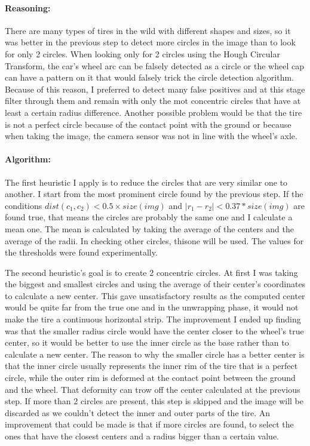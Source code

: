 \paragraph*{Reasoning:}\mbox{}\par
There are many types of tires in the wild with different shapes and sizes, so it was better in the previous step to detect more circles in the image than to look for only 2 circles. When looking only for 2 circles using the Hough Circular Transform, the car's wheel arc can be falsely detected as a circle or the wheel cap can have a pattern on it that would falsely trick the circle detection algorithm. Because of this reason, I preferred to detect many false positives and at this stage filter through them and remain with only the mot concentric circles that have at least a certain radius difference. Another possible problem would be that the tire is not a perfect circle because of the contact point with the ground or because when taking the image, the camera sensor was not in line with the wheel's axle.

\paragraph*{Algorithm:}\mbox{}\par
The first heuristic I apply is to reduce the circles that are very similar one to another. I start from the most prominent circle found by the previous step. If the conditions $dist(c_1, c_2) < 0.5 \times size(img)$ and $\Big|r_1 - r_2\Big| < 0.37 * size(img)$ are found true, that means the circles are probably the same one and I calculate a mean one. The mean is calculated by taking the average of the centers and the average of the radii. In checking other circles, thisone will be used. The values for the thresholds were found experimentally.

The second heuristic's goal is to create 2 concentric circles. At first I was taking the biggest and smallest circles and using the average of their center's coordinates to calculate a new center. This gave unsatisfactory results as the computed center would be quite far from the true one and in the unwrapping phase, it would not make the tire a continuous horizontal strip. The improvement I ended up finding was that the smaller radius circle would have the center closer to the wheel's true center, so it would be better to use the inner circle as the base rather than to calculate a new center. The reason to why the smaller circle has a better center is that the inner circle usually represents the inner rim of the tire that is a perfect circle, while the outer rim is deformed at the contact point between the ground and the wheel. That deformity can trow off the center calculated at the previous step. If more than 2 circles are present, this step is skipped and the image will be discarded as we couldn't detect the inner and outer parts of the tire. An improvement that could be made is that if more circles are found, to select the ones that have the closest centers and a radius bigger than a certain value.

